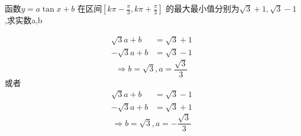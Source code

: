 \documentclass[12pt,answers]{exam}
\begin{document}
\begin{questions}
\question 
函数$y=a\tan{x}+b$ 在区间$[k\pi-\frac{\pi}{3},k\pi+\frac{\pi}{3}]$ 的最大最小值分别为$\sqrt{3}+1,\sqrt{3}-1$,求实数a,b
\begin{solution}
\begin{equation*}
\begin{split}
\sqrt{3}a+b&=\sqrt{3}+1 \\
-\sqrt{3}a+b &=\sqrt{3}-1
\end{split}
\end{equation*}
$$\Longrightarrow b=\sqrt{3},a=\frac{\sqrt{3}}{3}$$
或者
\begin{equation*}
\begin{split}
\sqrt{3}a+b&=\sqrt{3}-1 \\
-\sqrt{3}a+b &=\sqrt{3}+1
\end{split}
\end{equation*}
$$\Longrightarrow b=\sqrt{3},a=-\frac{\sqrt{3}}{3}$$
\end{solution}


\end{questions}
\end{document}
